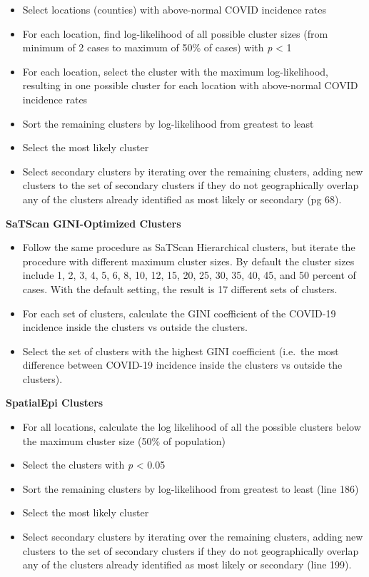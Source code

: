 \documentclass[
]{article}
\providecommand{\tightlist}{%
  \setlength{\itemsep}{0pt}\setlength{\parskip}{0pt}}
\begin{document}
\begin{itemize}
\tightlist
\item
  Select locations (counties) with above-normal COVID incidence rates
\item
  For each location, find log-likelihood of all possible cluster sizes
  (from minimum of 2 cases to maximum of 50\% of cases) with \emph{p}
  \textless{} 1
\item
  For each location, select the cluster with the maximum log-likelihood,
  resulting in one possible cluster for each location with above-normal
  COVID incidence rates
\item
  Sort the remaining clusters by log-likelihood from greatest to least
\item
  Select the most likely cluster
\item
  Select secondary clusters by iterating over the remaining clusters,
  adding new clusters to the set of secondary clusters if they do not
  geographically overlap any of the clusters already identified as most
  likely or secondary (pg 68).
\end{itemize}

\textbf{SaTScan GINI-Optimized Clusters}

\begin{itemize}
\tightlist
\item
  Follow the same procedure as SaTScan Hierarchical clusters, but
  iterate the procedure with different maximum cluster sizes. By default
  the cluster sizes include 1, 2, 3, 4, 5, 6, 8, 10, 12, 15, 20, 25, 30,
  35, 40, 45, and 50 percent of cases. With the default setting, the
  result is 17 different sets of clusters.
\item
  For each set of clusters, calculate the GINI coefficient of the
  COVID-19 incidence inside the clusters vs outside the clusters.
\item
  Select the set of clusters with the highest GINI coefficient (i.e.~the
  most difference between COVID-19 incidence inside the clusters vs
  outside the clusters).
\end{itemize}

\textbf{SpatialEpi Clusters}

\begin{itemize}
\tightlist
\item
  For all locations, calculate the log likelihood of all the possible
  clusters below the maximum cluster size (50\% of population)
\item
  Select the clusters with \emph{p} \textless{} 0.05
\item
  Sort the remaining clusters by log-likelihood from greatest to least
  (line 186)
\item
  Select the most likely cluster
\item
  Select secondary clusters by iterating over the remaining clusters,
  adding new clusters to the set of secondary clusters if they do not
  geographically overlap any of the clusters already identified as most
  likely or secondary (line 199).
\end{itemize}
\end{document}
